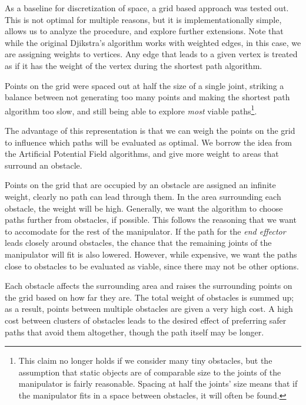 As a baseline for discretization of space, a grid based approach was tested out. This is not optimal for multiple reasons, but it is implementationally simple, allows us to analyze the procedure, and explore further extensions. Note that while the original Djikstra's algorithm works with weighted edges, in this case, we are assigning weights to vertices. Any edge that leads to a given vertex is treated as if it has the weight of the vertex during the shortest path algorithm.

Points on the grid were spaced out at half the size of a single joint, striking a balance between not generating too many points and making the shortest path algorithm too slow, and still being able to explore \textit{most} viable paths\footnote{This claim no longer holds if we consider many tiny obstacles, but the assumption that static objects are of comparable size to the joints of the manipulator is fairly reasonable. Spacing at half the joints' size means that if the manipulator fits in a space between obstacles, it will often be found.}.

The advantage of this representation is that we can weigh the points on the grid to influence which paths will be evaluated as optimal. We borrow the idea from the Artificial Potential Field algorithms, and give more weight to areas that surround an obstacle.

Points on the grid that are occupied by an obstacle are assigned an infinite weight, clearly no path can lead through them. In the area surrounding each obstacle, the weight will be high. Generally, we want the algorithm to choose paths further from obstacles, if possible. This follows the reasoning that we want to accomodate for the rest of the manipulator. If the path for the \textit{end effector} leads closely around obstacles, the chance that the remaining joints of the manipulator will fit is also lowered. However, while expensive, we want the paths close to obstacles to be evaluated as viable, since there may not be other options.

Each obstacle affects the surrounding area and raises the surrounding points on the grid based on how far they are. The total weight of obstacles is summed up; as a result, points between multiple obstacles are given a very high cost. A high cost between clusters of obstacles leads to the desired effect of preferring safer paths that avoid them altogether, though the path itself may be longer.

